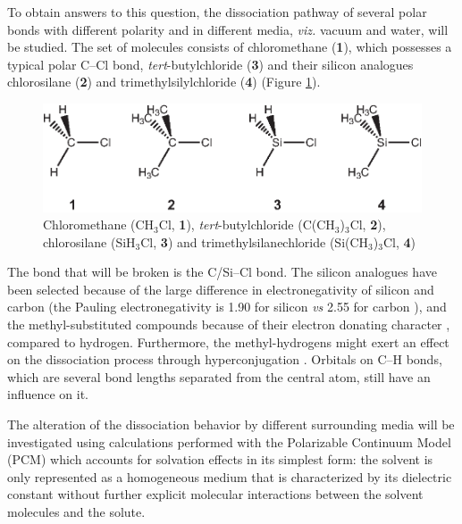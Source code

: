 To obtain answers to this question, the dissociation pathway of several polar bonds with different polarity and in different media, \textit{viz.} vacuum and water, will be studied.  The set of molecules consists of chloromethane (\textbf{1}), which possesses a typical polar C--Cl bond, \textit{tert}-butylchloride (\textbf{3}) and their silicon analogues chlorosilane (\textbf{2}) and trimethylsilylchloride (\textbf{4}) (Figure \ref{ch3.fig.compounds}).  
\begin{figure}[htbp]
\begin{center}
\includegraphics{dissociation/figures/compounds.eps}
\end{center}
\caption{Chloromethane (CH$_3$Cl, \textbf{1}), \textit{tert}-butylchloride
(C(CH$_3$)$_3$Cl, \textbf{2}), chlorosilane (SiH$_3$Cl, \textbf{3}) and trimethylsilanechloride
(Si(CH$_3$)$_3$Cl, \textbf{4})}
\label{ch3.fig.compounds}
\end{figure} 
The bond that will be broken is the C/Si--Cl bond.  The silicon analogues have been selected because of the large difference in electronegativity of silicon and carbon (the Pauling electronegativity is 1.90 for silicon \textit{vs} 2.55 for carbon \cite{handbook}), and the methyl-substituted compounds because of their electron donating character \cite{mcmurry}, compared to hydrogen. Furthermore, the methyl-hydrogens might exert an effect on the dissociation process through hyperconjugation \cite{march}. Orbitals on C--H bonds, which are several bond lengths separated from the central atom, still have an influence on it. 

The alteration of the dissociation behavior by different surrounding media will be investigated using calculations performed with the Polarizable Continuum Model (PCM) \cite{pcm1,pcm2} which accounts for solvation effects in its simplest form: the solvent is only represented as a homogeneous medium that is characterized by its dielectric constant without further explicit molecular interactions between the solvent molecules and the solute. 

